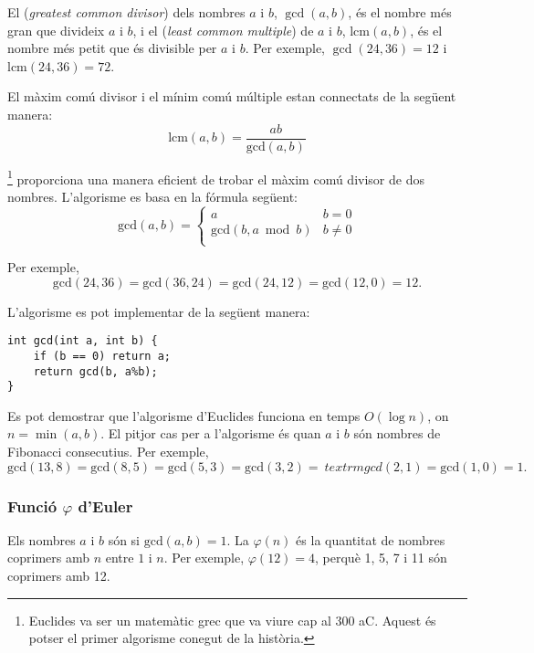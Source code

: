   

El  (\emph{greatest common divisor}) dels
nombres $a$ i $b$, $\gcd(a,b)$, és el nombre més gran que divideix $a$
i $b$, i el  (\emph{least common multiple})
de $a$ i $b$, $\textrm{lcm}(a,b)$, és el nombre més petit que és
divisible per $a$ i $b$. Per exemple, $\gcd(24,36)=12$ i
$\textrm{lcm}(24,36)=72$.

El màxim comú divisor i el mínim comú múltiple estan connectats de la
següent manera:
\[\textrm{lcm}(a,b)=\frac{ab}{\textrm{gcd}(a,b)}\]


\footnote{Euclides va ser un matemàtic grec
que va viure cap al 300 aC. Aquest és potser el primer algorisme
conegut de la història.} proporciona una manera eficient de trobar el
màxim comú divisor de dos nombres. L'algorisme es basa en la fórmula
següent:
\begin{equation*}
    \textrm{gcd}(a,b) = \begin{cases}
               a        & b = 0\\
               \textrm{gcd}(b,a \bmod b) & b \neq 0\\
           \end{cases}
\end{equation*}


Per exemple, \[\textrm{gcd}(24,36) = \textrm{gcd}(36,24) =
\textrm{gcd}(24,12) = \textrm{gcd}(12,0)=12 .\]

L'algorisme es pot implementar de la següent manera:
\begin{lstlisting}
int gcd(int a, int b) {
    if (b == 0) return a;
    return gcd(b, a%b);
}
\end{lstlisting}


Es pot demostrar que l'algorisme d'Euclides funciona en temps $O(\log
n)$, on $n=\min(a,b)$. El pitjor cas per a l'algorisme és quan $a$ i
$b$ són nombres de Fibonacci consecutius. Per
exemple, \[\textrm{gcd}(13,8)=\textrm{gcd}(8,5)
=\textrm{gcd}(5,3)=\textrm{gcd}(3,2)=\ textrm{gcd}(2,1)=\textrm{gcd}(1,0)=1.\]

\subsubsection{Funció $\varphi$ d'Euler}

 

Els nombres $a$ i $b$ són  si $\textrm{gcd}(a,b)=1$. La  $\varphi(n)$
és la quantitat de nombres coprimers amb $n$ entre $1$ i $n$. Per
exemple, $\varphi(12)=4$, perquè 1, 5, 7 i 11 són coprimers amb 12.

